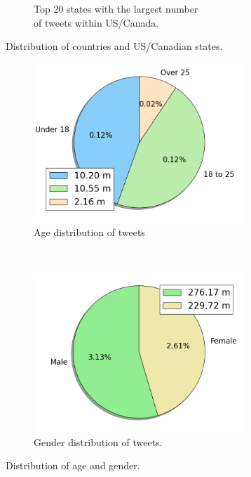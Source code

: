\documentclass[a4paper,12pt,twoside,openright]{report}
\begin{document}
{\begin{figure}
\begin{subfigure}[b]{8cm}
                \captionsetup{justification=centering}
                \caption{Top 20 states with the largest number \\of tweets within US/Canada.}
                \label{fig:chap3:states}
        \end{subfigure}
	\captionsetup{justification=centering}
        \caption{Distribution of countries and US/Canadian states.}
        \label{fig:chap3:location_dist}
	\hspace{-10mm}
        \begin{subfigure}[b]{8cm}
                \includegraphics[width=8cm]{figs/chap2/age.png}
                \caption{Age distribution of tweets}
                \label{fig:chap3:age}
        \end{subfigure}%
        ~ %
        \begin{subfigure}[b]{8cm}
                \includegraphics[width=8cm]{figs/chap2/gender.png}
                \caption{Gender distribution of tweets.}
                \label{fig:chap3:gender}
        \end{subfigure}
	\captionsetup{justification=centering}
        \caption[Distribution of age and gender.]{Distribution of age and gender.\footnotemark}
        \label{fig:chap3:age_gender_dist}
\end{figure}
}
\end{document}

